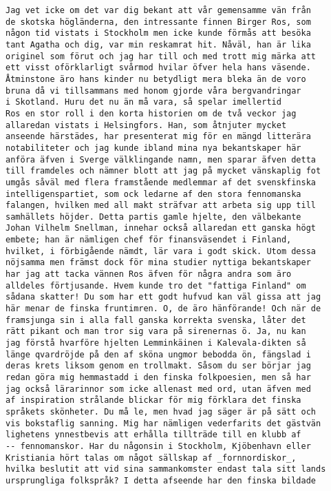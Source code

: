 \begin{verbatim}
Jag vet icke om det var dig bekant att vår gemensamme vän från
de skotska högländerna, den intressante finnen Birger Ros, som
någon tid vistats i Stockholm men icke kunde förmås att besöka
tant Agatha och dig, var min reskamrat hit. Nåväl, han är lika
originel som förut och jag har till och med trott mig märka att
ett visst oförklarligt svårmod hvilar öfver hela hans väsende.
Åtminstone äro hans kinder nu betydligt mera bleka än de voro
bruna då vi tillsammans med honom gjorde våra bergvandringar
i Skotland. Huru det nu än må vara, så spelar imellertid
Ros en stor roll i den korta historien om de två veckor jag
allaredan vistats i Helsingfors. Han, som åtnjuter mycket
anseende härstädes, har presenterat mig för en mängd litterära
notabiliteter och jag kunde ibland mina nya bekantskaper här
anföra äfven i Sverge välklingande namn, men sparar äfven detta
till framdeles och nämner blott att jag på mycket vänskaplig fot
umgås såväl med flera framstående medlemmar af det svenskfinska
intelligenspartiet, som ock ledarne af den stora fennomanska
falangen, hvilken med all makt sträfvar att arbeta sig upp till
samhällets höjder. Detta partis gamle hjelte, den välbekante
Johan Vilhelm Snellman, innehar också allaredan ett ganska högt
embete; han är nämligen chef för finansväsendet i Finland,
hvilket, i förbigående nämdt, lär vara i godt skick. Utom dessa
nöjsamma men främst dock för mina studier nyttiga bekantskaper
har jag att tacka vännen Ros äfven för några andra som äro
alldeles förtjusande. Hvem kunde tro det "fattiga Finland" om
sådana skatter! Du som har ett godt hufvud kan väl gissa att jag
här menar de finska fruntimren. O, de äro hänförande! Och när de
framsjunga sin i alla fall ganska korrekta svenska, låter det
rätt pikant och man tror sig vara på sirenernas ö. Ja, nu kan
jag förstå hvarföre hjelten Lemminkäinen i Kalevala-dikten så
länge qvardröjde på den af sköna ungmor bebodda ön, fängslad i
deras krets liksom genom en trollmakt. Såsom du ser börjar jag
redan göra mig hemmastadd i den finska folkpoesien, men så har
jag också lärarinnor som icke allenast med ord, utan äfven med
af inspiration strålande blickar för mig förklara det finska
språkets skönheter. Du må le, men hvad jag säger är på sätt och
vis bokstaflig sanning. Mig har nämligen vederfarits det gästvän
lighetens ynnestbevis att erhålla tillträde till en klubb af
-- fennomanskor. Har du någonsin i Stockholm, Kjöbenhavn eller
Kristiania hört talas om något sällskap af _fornnordiskor_,
hvilka beslutit att vid sina sammankomster endast tala sitt lands
ursprungliga folkspråk? I detta afseende har den finska bildade

\end{verbatim}
